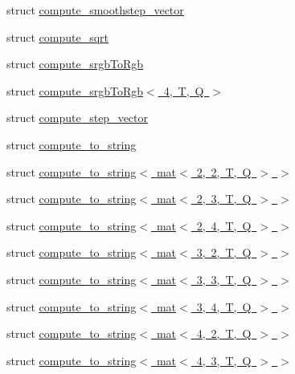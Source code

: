 \begin{DoxyCompactItemize}
\item 
struct \mbox{\hyperlink{structglm_1_1detail_1_1compute__smoothstep__vector}{compute\+\_\+smoothstep\+\_\+vector}}
\item 
struct \mbox{\hyperlink{structglm_1_1detail_1_1compute__sqrt}{compute\+\_\+sqrt}}
\item 
struct \mbox{\hyperlink{structglm_1_1detail_1_1compute__srgb_to_rgb}{compute\+\_\+srgb\+To\+Rgb}}
\item 
struct \mbox{\hyperlink{structglm_1_1detail_1_1compute__srgb_to_rgb_3_014_00_01_t_00_01_q_01_4}{compute\+\_\+srgb\+To\+Rgb$<$ 4, T, Q $>$}}
\item 
struct \mbox{\hyperlink{structglm_1_1detail_1_1compute__step__vector}{compute\+\_\+step\+\_\+vector}}
\item 
struct \mbox{\hyperlink{structglm_1_1detail_1_1compute__to__string}{compute\+\_\+to\+\_\+string}}
\item 
struct \mbox{\hyperlink{structglm_1_1detail_1_1compute__to__string_3_01mat_3_012_00_012_00_01_t_00_01_q_01_4_01_4}{compute\+\_\+to\+\_\+string$<$ mat$<$ 2, 2, T, Q $>$ $>$}}
\item 
struct \mbox{\hyperlink{structglm_1_1detail_1_1compute__to__string_3_01mat_3_012_00_013_00_01_t_00_01_q_01_4_01_4}{compute\+\_\+to\+\_\+string$<$ mat$<$ 2, 3, T, Q $>$ $>$}}
\item 
struct \mbox{\hyperlink{structglm_1_1detail_1_1compute__to__string_3_01mat_3_012_00_014_00_01_t_00_01_q_01_4_01_4}{compute\+\_\+to\+\_\+string$<$ mat$<$ 2, 4, T, Q $>$ $>$}}
\item 
struct \mbox{\hyperlink{structglm_1_1detail_1_1compute__to__string_3_01mat_3_013_00_012_00_01_t_00_01_q_01_4_01_4}{compute\+\_\+to\+\_\+string$<$ mat$<$ 3, 2, T, Q $>$ $>$}}
\item 
struct \mbox{\hyperlink{structglm_1_1detail_1_1compute__to__string_3_01mat_3_013_00_013_00_01_t_00_01_q_01_4_01_4}{compute\+\_\+to\+\_\+string$<$ mat$<$ 3, 3, T, Q $>$ $>$}}
\item 
struct \mbox{\hyperlink{structglm_1_1detail_1_1compute__to__string_3_01mat_3_013_00_014_00_01_t_00_01_q_01_4_01_4}{compute\+\_\+to\+\_\+string$<$ mat$<$ 3, 4, T, Q $>$ $>$}}
\item 
struct \mbox{\hyperlink{structglm_1_1detail_1_1compute__to__string_3_01mat_3_014_00_012_00_01_t_00_01_q_01_4_01_4}{compute\+\_\+to\+\_\+string$<$ mat$<$ 4, 2, T, Q $>$ $>$}}
\item 
struct \mbox{\hyperlink{structglm_1_1detail_1_1compute__to__string_3_01mat_3_014_00_013_00_01_t_00_01_q_01_4_01_4}{compute\+\_\+to\+\_\+string$<$ mat$<$ 4, 3, T, Q $>$ $>$}}

\end{DoxyCompactItemize}
